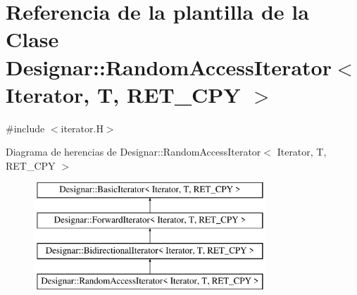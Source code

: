 \hypertarget{class_designar_1_1_random_access_iterator}{}\section{Referencia de la plantilla de la Clase Designar\+:\+:Random\+Access\+Iterator$<$ Iterator, T, R\+E\+T\+\_\+\+C\+PY $>$}
\label{class_designar_1_1_random_access_iterator}


{\ttfamily \#include $<$iterator.\+H$>$}

Diagrama de herencias de Designar\+:\+:Random\+Access\+Iterator$<$ Iterator, T, R\+E\+T\+\_\+\+C\+PY $>$\begin{figure}[H]
\begin{center}
\leavevmode
\includegraphics[height=4.000000cm]{class_designar_1_1_random_access_iterator}
\end{center}
\end{figure}
